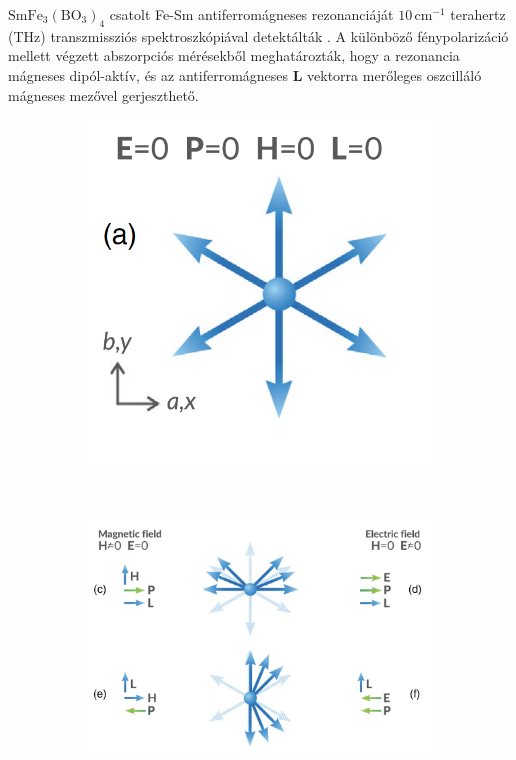 \documentclass[a4paper,12pt]{article}
\numberwithin{equation}{section}
\begin{document}
 
 
 ${\mathrm{SmFe_3(BO_3)_4}}$ csatolt Fe-Sm antiferromágneses rezonanciáját $10\,\mathrm{cm}^{-1}$ terahertz (THz) transzmissziós spektroszkópiával detektálták \cite{2018_PRL}. A különböző fénypolarizáció mellett végzett abszorpciós mérésekből meghatározták, hogy a rezonancia mágneses dipól-aktív, és az antiferromágneses \textbf{L} vektorra merőleges oszcilláló mágneses mezővel gerjeszthető.
 

\begin{figure}[H]
\begin{center}

\begin{subfigure}[b]{0.2\linewidth}
\includegraphics[width=\linewidth]{Dávidék mérései/homogenspin.png}
\end{subfigure}~%
\begin{subfigure}[b]{0.6\linewidth}
\includegraphics[width=\linewidth]{Dávidék mérései/spinE-B.png}


\end{subfigure}
\end{center}
\end{figure}
\end{document}
